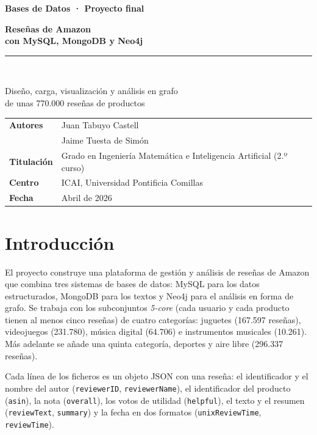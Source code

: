 \documentclass[11pt,a4paper]{article}
\newcommand{\code}[1]{\texttt{#1}}
\begin{document}
\begin{titlepage}

\vspace*{3.5cm}
{\large\color{azul}\bfseries Bases de Datos · Proyecto final}\\[14pt]
{\fontsize{30}{36}\selectfont\bfseries Reseñas de Amazon\\[2pt] con MySQL, MongoDB y Neo4j\par}
\vspace{12pt}
{\color{azul}\rule{0.55\linewidth}{2pt}}\\[12pt]
{\Large Diseño, carga, visualización y análisis en grafo\\ de unas 770.000 reseñas de productos\par}

\vfill
\begin{tabularx}{\linewidth}{@{}lX@{}}
\textbf{\color{azul}Autores} & Juan Tabuyo Castell\\
 & Jaime Tuesta de Simón\\[4pt]
\textbf{\color{azul}Titulación} & Grado en Ingeniería Matemática e Inteligencia Artificial (2.º curso)\\[4pt]
\textbf{\color{azul}Centro} & ICAI, Universidad Pontificia Comillas\\[4pt]
\textbf{\color{azul}Fecha} & Abril de 2026\\
\end{tabularx}
\vspace{1.5cm}
\end{titlepage}

\tableofcontents
\clearpage

\section{Introducción}

El proyecto construye una plataforma de gestión y análisis de reseñas de Amazon que combina tres sistemas de bases de datos: MySQL para los datos estructurados, MongoDB para los textos y Neo4j para el análisis en forma de grafo. Se trabaja con los subconjuntos \emph{5-core} (cada usuario y cada producto tienen al menos cinco reseñas) de cuatro categorías: juguetes (167.597 reseñas), videojuegos (231.780), música digital (64.706) e instrumentos musicales (10.261). Más adelante se añade una quinta categoría, deportes y aire libre (296.337 reseñas).

Cada línea de los ficheros es un objeto JSON con una reseña: el identificador y el nombre del autor (\code{reviewerID}, \code{reviewerName}), el identificador del producto (\code{asin}), la nota (\code{overall}), los votos de utilidad (\code{helpful}), el texto y el resumen (\code{reviewText}, \code{summary}) y la fecha en dos formatos (\code{unixReviewTime}, \code{reviewTime}).
\end{document}
